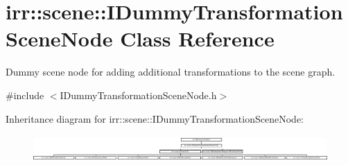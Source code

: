 \hypertarget{classirr_1_1scene_1_1IDummyTransformationSceneNode}{}\section{irr\+:\+:scene\+:\+:I\+Dummy\+Transformation\+Scene\+Node Class Reference}
\label{classirr_1_1scene_1_1IDummyTransformationSceneNode}


Dummy scene node for adding additional transformations to the scene graph.  




{\ttfamily \#include $<$I\+Dummy\+Transformation\+Scene\+Node.\+h$>$}

Inheritance diagram for irr\+:\+:scene\+:\+:I\+Dummy\+Transformation\+Scene\+Node\+:\begin{figure}[H]
\begin{center}
\leavevmode
\includegraphics[height=1.022364cm]{classirr_1_1scene_1_1IDummyTransformationSceneNode}
\end{center}
\end{figure}
